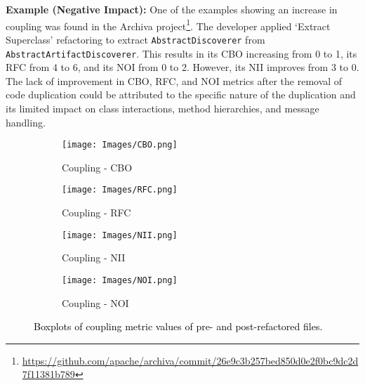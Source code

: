 \noindent\textbf{Example (Negative Impact):} One of the examples showing an increase in coupling was found in the Archiva project\footnote{\textcolor{black}{\url{https://github.com/apache/archiva/commit/26e9c3b257bed850d0e2f0bc9dc2d7f11381b789}}}. The developer applied `Extract Superclass' refactoring to extract \texttt{AbstractDiscoverer} from \texttt{AbstractArtifact\break Discoverer}. This results in its CBO increasing from 0 to 1, its RFC from 4 to 6, and its NOI from 0 to 2. However, its NII improves from 3 to 0. The lack of improvement in CBO, RFC, and NOI metrics after the removal of code duplication could be attributed to the specific nature of the duplication and its limited impact on class interactions, method hierarchies, and message handling. 
\begin{figure*}
\centering
\begin{subfigure}{3.5cm}
\centering\texttt{[image: Images/CBO.png]}
\caption{Coupling - CBO}
\label{BP:coupling-cbo}
\end{subfigure}%
\begin{subfigure}{3.5cm}
\centering\texttt{[image: Images/RFC.png]}
\caption{Coupling - RFC}
\label{BP:coupling-rfc}
\end{subfigure}%
\begin{subfigure}{3.5cm}
\centering\texttt{[image: Images/NII.png]}
\caption{Coupling - NII}
\label{BP:coupling-nii}
\end{subfigure}%
\begin{subfigure}{3.5cm}
\centering\texttt{[image: Images/NOI.png]}
\caption{Coupling - NOI}
\label{BP:coupling-noi}
\end{subfigure}%
\caption{\textcolor{black}{Boxplots of coupling metric values of pre- and post-refactored files.}}
\label{Chart:Boxplots_coupling}
\end{figure*}
